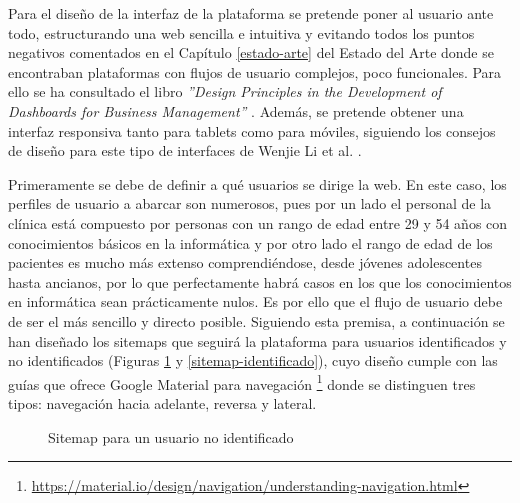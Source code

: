 Para el diseño de la interfaz de la plataforma se pretende poner al usuario ante todo, estructurando una web sencilla e intuitiva y evitando todos los puntos negativos comentados en el Capítulo \ref{estado-arte} del Estado del Arte donde se encontraban plataformas con flujos de usuario complejos, poco funcionales. Para ello se ha consultado el libro \textit{''Design Principles in the Development of Dashboards for Business Management''} \cite{martins2022design}. Además, se pretende obtener una interfaz responsiva tanto para tablets como para móviles, siguiendo los consejos de diseño para este tipo de interfaces de Wenjie Li et al. \cite{li2022design}.  \bigskip

Primeramente se debe de definir a qué usuarios se dirige la web. En este caso, los perfiles de usuario a abarcar son numerosos, pues por un lado el personal de la clínica está compuesto por personas con un rango de edad entre 29 y 54 años con conocimientos básicos en la informática y por otro lado el rango de edad de los pacientes es mucho más extenso comprendiéndose, desde jóvenes adolescentes hasta ancianos, por lo que perfectamente habrá casos en los que los conocimientos en informática sean prácticamente nulos. Es por ello que el flujo de usuario debe de ser el más sencillo y directo posible. Siguiendo esta premisa, a continuación se han diseñado los sitemaps que seguirá la plataforma para usuarios identificados y no identificados (Figuras \ref{sitemap-no-identificado} y \ref{sitemap-identificado}), cuyo diseño cumple con las guías que ofrece Google Material para navegación \footnote{\url{https://material.io/design/navigation/understanding-navigation.html}} donde se distinguen tres tipos: navegación hacia adelante, reversa y lateral.

\begin{figure}[H]
    \caption{Sitemap para un usuario no identificado}
    \label{sitemap-no-identificado}
\end{figure}

